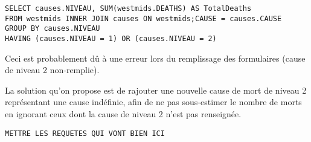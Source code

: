     \begin{lstlisting}[frame=single]
SELECT causes.NIVEAU, SUM(westmids.DEATHS) AS TotalDeaths
FROM westmids INNER JOIN causes ON westmids;CAUSE = causes.CAUSE
GROUP BY causes.NIVEAU
HAVING (causes.NIVEAU = 1) OR (causes.NIVEAU = 2)
    \end{lstlisting}

    Ceci est probablement dû à une erreur lors du remplissage des formulaires (cause de niveau 2 non-remplie).

    La solution qu'on propose est de rajouter une nouvelle cause de mort de niveau 2 représentant une cause indéfinie, afin
    de ne pas sous-estimer le nombre de morts en ignorant ceux dont la cause de niveau 2 n'est pas renseignée.

    \begin{lstlisting}[frame=single]
METTRE LES REQUETES QUI VONT BIEN ICI
    \end{lstlisting}
